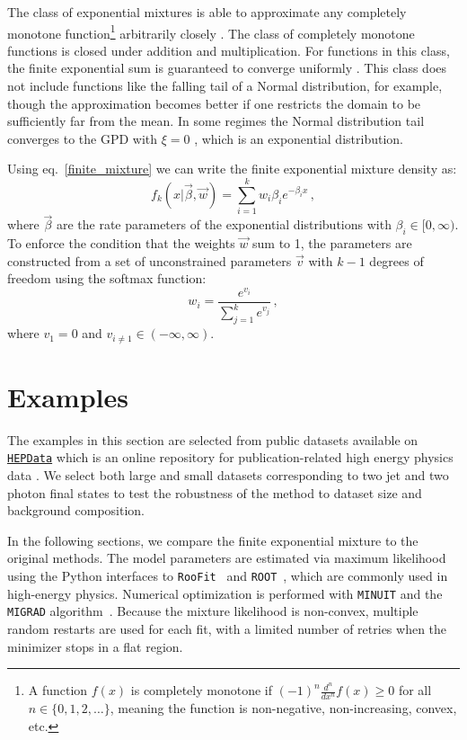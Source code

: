 \documentclass[a4paper,11pt]{article}
\begin{document}
The class of exponential mixtures is able to approximate any completely monotone function\footnote{\label{cm_def}A function $f(x)$ is completely monotone if $(-1)^n \frac{d^n}{dx^n}f(x) \geq 0$ for all $n \in \{0,1,2,\ldots\}$, meaning the function is non-negative, non-increasing, convex, etc.} arbitrarily closely \cite{bernstein}. The class of completely monotone functions is closed under addition and multiplication. For functions in this class, the finite exponential sum is guaranteed to converge uniformly \cite{McGlinn_1978}.
This class does not include functions like the falling tail of a Normal distribution, for 
example, though the approximation becomes better if one restricts the domain to be sufficiently far from the mean. In some regimes the Normal distribution tail converges to the GPD with 
$\xi=0$ \cite{Resnick_1986}, which is an exponential distribution.

Using eq.~\eqref{finite_mixture} we can write the finite exponential mixture density as:
\begin{equation}
f_k(x|\vec{\beta}, \vec{w}) = \sum_{i=1}^k w_i \beta_i e^{-\beta_i x} \, ,
\end{equation}
where $\vec\beta$ are the rate parameters of the exponential distributions with $\beta_i \in 
[0,\infty)$. To enforce the condition that the weights $\vec{w}$ sum to 1, the parameters are 
constructed from a set of unconstrained parameters $\vec{v}$ with $k-1$ degrees of freedom 
using the softmax function:
\begin{equation}
\label{softmax}
w_i = \frac{e^{v_i}}{\sum_{j=1}^{k}e^{v_j}} \, ,
\end{equation}
where $v_1=0$ and $v_{i\neq 1} \in (-\infty,\infty)$.

\section{Examples} \label{sec:examples}

The examples in this section are selected from public datasets available on \href{https://www.hepdata.net/}{\texttt{HEPData}} which is an online repository for publication-related high energy physics data \cite{Maguire_2017}. We select both large and small datasets corresponding to two jet and two photon final states to test the robustness of the method to dataset size and background composition.

In the following sections, we compare the finite exponential mixture to the original methods. The model parameters are estimated via maximum likelihood using the Python interfaces to \texttt{RooFit}~\cite{RooFit} and \texttt{ROOT}~\cite{ROOT}, which are commonly used in high-energy physics.
Numerical optimization is performed with \texttt{MINUIT} and the \texttt{MIGRAD} 
algorithm~\cite{Minuit2}.
Because the mixture likelihood is non-convex, multiple random restarts are used for each fit, with a limited number of retries when the minimizer stops in a flat region.
\end{document}
